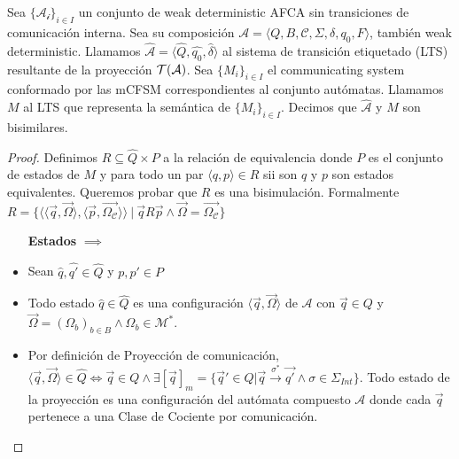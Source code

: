 \begin{prop} Sea $\{\mathcal{A_i}\}_{i \in I}$ un conjunto de weak deterministic AFCA sin transiciones de comunicación interna. Sea su composición $\mathcal{A} = \langle Q, B, \mathcal{C},\Sigma, \delta, q_0, F \rangle$, también weak deterministic. Llamamos $\hat{\mathcal{A}}=\langle \hat{Q}, \hat{q_0}, \hat{\delta} \rangle$ al sistema de transición etiquetado (LTS) resultante de la proyección $\mathcal{T}(\mathcal{A})$. Sea $\{M_i\}_{i \in I}$ el communicating system conformado por las mCFSM correspondientes al conjunto autómatas. Llamamos $M$ al LTS que representa la semántica de $\{M_i\}_{i \in I}$. Decimos que $\hat{\mathcal{A}}$ y $M$ son bisimilares. 

\begin{proof}

Definimos $R \subseteq \hat{Q} \times P$ a la relación de equivalencia donde $P$ es el conjunto de estados de $M$ y para todo un par $\langle q, p \rangle \in R$ sii son $q$ y $p$ son estados equivalentes. Queremos probar que $R$ es una bisimulación. Formalmente $R = \{ \langle \langle \overrightarrow{q}, \overrightarrow{\Omega} \rangle, \langle \overrightarrow{p}, \overrightarrow{\Omega_{\mathcal{C}}} \rangle \rangle \ | \ \overrightarrow{q}R\overrightarrow{p} \land  \overrightarrow{\Omega}=\overrightarrow{\Omega_{\mathcal{C}}} \}$

\begin{itemize}
    
    \item[\textbf{Estados} $\implies$] 
    \item Sean $\hat{q},\hat{q'} \in \hat{Q}$ y $p,p' \in P$
    \item Todo estado $\hat{q} \in \hat{Q}$ es una configuración $\langle \overrightarrow{q}, \overrightarrow{\Omega} \rangle$ de $\mathcal{A}$ con $\overrightarrow{q} \in Q$ y $\overrightarrow{\Omega}= (\Omega_b)_{b \in B} \land \Omega_b \in \mathcal{M}^*$. 
    
    \item Por definición de Proyección de comunicación, $\langle \overrightarrow{q}, \overrightarrow{\Omega} \rangle \in \hat{Q} \iff \overrightarrow{q} \in Q \land \exists [\overrightarrow{q}]_m = \{\overrightarrow{q}' \in Q | \overrightarrow{q} \xrightarrow{\sigma^*} \overrightarrow{q'} \land \sigma  \in  \Sigma_{Int}\}$. Todo estado de la proyección es una configuración del autómata compuesto $\mathcal{A}$ donde cada $\overrightarrow{q}$ pertenece a una Clase de Cociente por comunicación.
    

\end{itemize}
\end{proof}
\end{prop}
